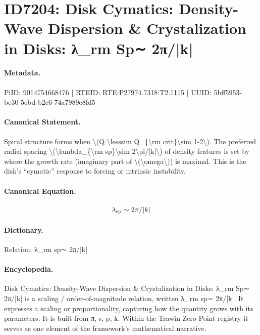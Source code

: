 \section*{ID7204: Disk Cymatics: Density-Wave Dispersion \& Crystalization in Disks: λ\_rm Sp∼ 2π/|k|}
\paragraph{Metadata.}
PiID: 9014754668476 | RTEID: RTE:P27974.7318:T2.1115 | UUID: 5bff5953-be30-5ebd-b2c6-74a7989e8fd5

\paragraph{Canonical Statement.}
Spiral structure forms when \textbackslash{}(Q \textbackslash{}lesssim Q\_\{\textbackslash{}rm crit\}\textbackslash{}sim 1-2\textbackslash{}). The preferred radial spacing \textbackslash{}(\textbackslash{}lambda\_\{\textbackslash{}rm sp\}\textbackslash{}sim 2\textbackslash{}pi/|k|\textbackslash{}) of density features is set by where the growth rate (imaginary part of \textbackslash{}(\textbackslash{}omega\textbackslash{})) is maximal. This is the disk’s “cymatic” response to forcing or intrinsic instability.

\paragraph{Canonical Equation.}
\[
\lambda_{\rm sp}\sim 2\pi/|k|
\]

\paragraph{Dictionary.}
Relation: λ\_rm sp∼ 2π/|k|

\paragraph{Encyclopedia.}
Disk Cymatics: Density-Wave Dispersion \& Crystalization in Disks: λ\_rm Sp∼ 2π/|k| is a scaling / order-of-magnitude relation, written λ\_rm sp∼ 2π/|k|. It expresses a scaling or proportionality, capturing how the quantity grows with its parameters. It is built from π, s, p, k. Within the Trawin Zero Point registry it serves as one element of the framework's mathematical narrative.
